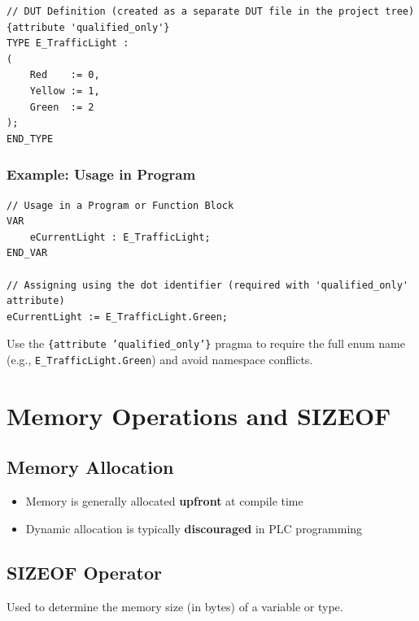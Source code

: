 \documentclass[11pt,a4paper]{article}
\begin{document}
\begin{lstlisting}
// DUT Definition (created as a separate DUT file in the project tree)
{attribute 'qualified_only'}
TYPE E_TrafficLight :
(
    Red    := 0,
    Yellow := 1,
    Green  := 2
);
END_TYPE
\end{lstlisting}

\subsubsection*{Example: Usage in Program}

\begin{lstlisting}
// Usage in a Program or Function Block
VAR
    eCurrentLight : E_TrafficLight;
END_VAR

// Assigning using the dot identifier (required with 'qualified_only' attribute)
eCurrentLight := E_TrafficLight.Green;
\end{lstlisting}

\begin{tipbox}
Use the \texttt{\{attribute 'qualified\_only'\}} pragma to require the full enum name (e.g., \texttt{E\_TrafficLight.Green}) and avoid namespace conflicts.
\end{tipbox}

\section{Memory Operations and SIZEOF}

\subsection{Memory Allocation}

\begin{itemize}
    \item Memory is generally allocated \textbf{upfront} at compile time
    \item Dynamic allocation is typically \textbf{discouraged} in PLC programming
\end{itemize}

\subsection{SIZEOF Operator}

Used to determine the memory size (in bytes) of a variable or type.
\end{document}
